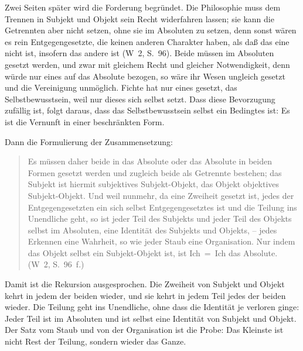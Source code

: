 \documentclass[11pt,a4paper]{article}
\newcommand{\SO}{Subjekt-Objekt}
\newcommand{\Werke}[1]{(W~2, S.~#1)}
\begin{document}
Zwei Seiten später wird die Forderung begründet. Die Philosophie muss dem Trennen in Subjekt und Objekt sein Recht widerfahren lassen; sie kann die Getrennten aber nicht setzen, ohne sie im Absoluten zu setzen, denn sonst wären es \glqq rein Entgegengesetzte, die keinen anderen Charakter haben, als daß das eine nicht ist, insofern das andere ist\grqq{} \Werke{96}. Beide müssen im Absoluten gesetzt werden, und zwar mit gleichem Recht und gleicher Notwendigkeit, denn würde nur eines auf das Absolute bezogen, so wäre ihr Wesen ungleich gesetzt und die Vereinigung unmöglich. Fichte hat nur eines gesetzt, das Selbstbewusstsein, weil nur dieses sich selbst setzt. Dass diese Bevorzugung zufällig ist, folgt daraus, dass das Selbstbewusstsein selbst ein Bedingtes ist: Es ist die Vernunft in einer beschränkten Form.

Dann die Formulierung der Zusammensetzung:

\begin{quote}
\glqq Es müssen daher beide in das Absolute oder das Absolute in beiden Formen gesetzt werden und zugleich beide als Getrennte bestehen; das Subjekt ist hiermit subjektives \SO{}, das Objekt objektives \SO{}. Und weil nunmehr, da eine Zweiheit gesetzt ist, jedes der Entgegengesetzten ein sich selbst Entgegengesetztes ist und die Teilung ins Unendliche geht, so ist jeder Teil des Subjekts und jeder Teil des Objekts selbst im Absoluten, eine Identität des Subjekts und Objekts, -- jedes Erkennen eine Wahrheit, so wie jeder Staub eine Organisation. Nur indem das Objekt selbst ein \SO{} ist, ist Ich~=~Ich das Absolute.\grqq{} \Werke{96~f.}
\end{quote}

Damit ist die Rekursion ausgesprochen. Die Zweiheit von Subjekt und Objekt kehrt in jedem der beiden wieder, und sie kehrt in jedem Teil jedes der beiden wieder. Die Teilung geht ins Unendliche, ohne dass die Identität je verloren ginge: Jeder Teil ist im Absoluten und ist selbst eine Identität von Subjekt und Objekt. Der Satz vom Staub und von der Organisation ist die Probe: Das Kleinste ist nicht Rest der Teilung, sondern wieder das Ganze.
\end{document}
